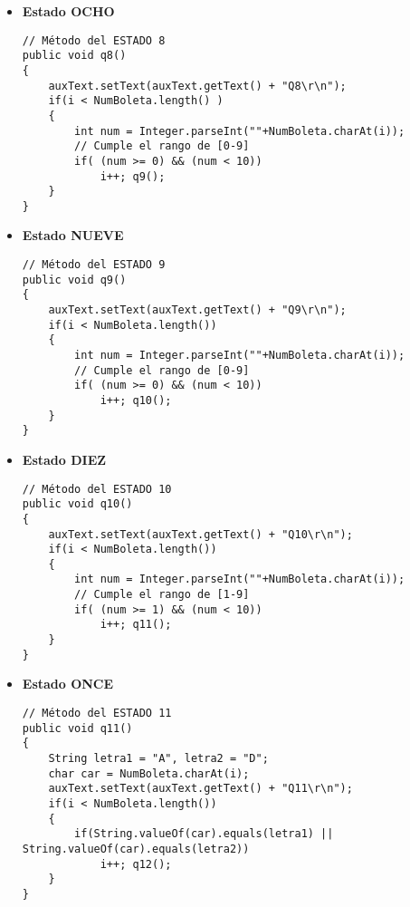 \documentclass[12pt]{article}
\begin{document}
\begin{itemize}
		\begin{lstlisting}[style=Java]
// Método del ESTADO 7
public void q7()
{
	auxText.setText(auxText.getText() + "Q7\r\n");
	if(i < NumBoleta.length())
	{
		int num = Integer.parseInt(""+NumBoleta.charAt(i));
		int numAnt = Integer.parseInt(""+NumBoleta.charAt(i-1));
		if(numAnt == 0)
		{
			// Cumple el rango de [0-9]
			if( (num >= 0) && (num < 10))
				i++; q8();
		}
		else 
		{
			// Cumple el rango de [0-2]
			if( (num >= 0) && (num < 3))
				i++; q8();
		}
	}	
}
		\end{lstlisting}

\newpage
		\item[$\overrightarrow$] \textbf{Estado OCHO}

		\begin{lstlisting}[style=Java]
// Método del ESTADO 8
public void q8()
{
	auxText.setText(auxText.getText() + "Q8\r\n");
	if(i < NumBoleta.length() )
	{
		int num = Integer.parseInt(""+NumBoleta.charAt(i));
		// Cumple el rango de [0-9]
		if( (num >= 0) && (num < 10))
			i++; q9();
	}	
}
		\end{lstlisting}

		\item[$\overrightarrow$] \textbf{Estado NUEVE}

		\begin{lstlisting}[style=Java]
// Método del ESTADO 9
public void q9()
{
	auxText.setText(auxText.getText() + "Q9\r\n");
	if(i < NumBoleta.length())
	{
		int num = Integer.parseInt(""+NumBoleta.charAt(i));
		// Cumple el rango de [0-9]
		if( (num >= 0) && (num < 10))
			i++; q10();
	}	
}
		\end{lstlisting}

		\item[$\overrightarrow$] \textbf{Estado DIEZ}

		\begin{lstlisting}[style=Java]
// Método del ESTADO 10
public void q10()
{
	auxText.setText(auxText.getText() + "Q10\r\n");
	if(i < NumBoleta.length())
	{
		int num = Integer.parseInt(""+NumBoleta.charAt(i));
		// Cumple el rango de [1-9]
		if( (num >= 1) && (num < 10))
			i++; q11();
	}	
}
		\end{lstlisting}

		\newpage

		\item[$\overrightarrow$] \textbf{Estado ONCE}

		\begin{lstlisting}[style=Java]
// Método del ESTADO 11
public void q11()
{
	String letra1 = "A", letra2 = "D";
	char car = NumBoleta.charAt(i);
	auxText.setText(auxText.getText() + "Q11\r\n");
	if(i < NumBoleta.length())
	{
		if(String.valueOf(car).equals(letra1) || String.valueOf(car).equals(letra2))
			i++; q12();	
	}
}
		\end{lstlisting}


\end{itemize}
\end{document}
